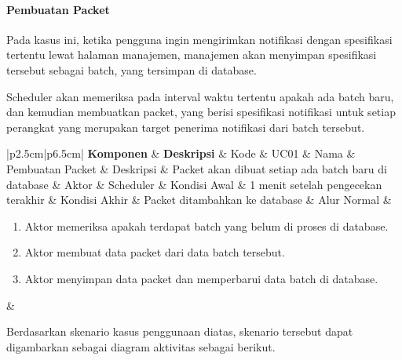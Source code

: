 \newcommand\tableUcDesc[7] {
\begin{longtable}{|p{2.5cm}|p{6.5cm}|}
    \hline
    \textbf{Komponen} & \textbf{Deskripsi} & \hline
    Kode & #1 & \hline
    Nama & #2 & \hline
    Deskripsi & #3 & \hline
    Aktor & #4 & \hline
    Kondisi Awal & #5 & \hline
    Kondisi Akhir & #6 & \hline
    Alur Normal & #7 & \hline
    \caption{Kasus Penggunaan #2}
\end{longtable}
}

\paragraph{Pembuatan Packet}
\par Pada kasus ini, ketika pengguna ingin mengirimkan notifikasi dengan spesifikasi tertentu lewat halaman manajemen,
manajemen akan menyimpan spesifikasi tersebut sebagai batch, yang tersimpan di database.
\par Scheduler akan memeriksa pada interval waktu tertentu apakah ada batch baru, dan kemudian membuatkan packet, yang
berisi spesifikasi notifikasi untuk setiap perangkat yang merupakan target penerima notifikasi dari batch tersebut.
\tableUcDesc
{UC01}
{Pembuatan Packet}
{Packet akan dibuat setiap ada batch baru di database}
{Scheduler}
{1 menit setelah pengecekan terakhir}
{Packet ditambahkan ke database}
{
\begin{enumerate}
    \item Aktor memeriksa apakah terdapat batch yang belum di proses di database.
    \item Aktor membuat data packet dari data batch tersebut.
    \item Aktor menyimpan data packet dan memperbarui data batch di database.
\end{enumerate}
}
\par Berdasarkan skenario kasus penggunaan diatas, skenario tersebut dapat digambarkan sebagai diagram aktivitas
sebagai berikut.

